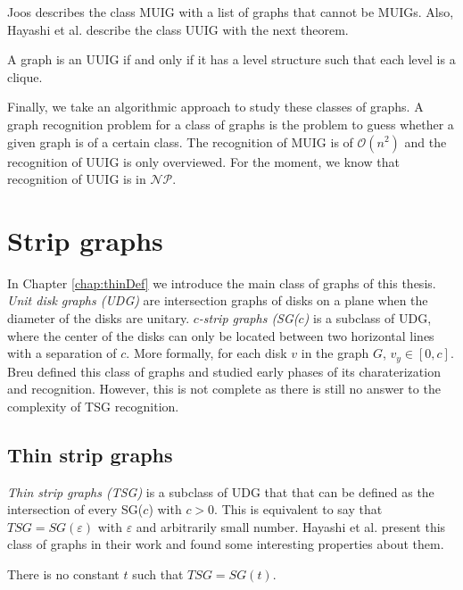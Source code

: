 Joos describes the class MUIG \cite{joosCharacterizationMixedUnit2013} with a list of graphs that cannot be MUIGs. Also, Hayashi et al. describe the class UUIG with the next theorem.

\begin{_theo}
  A graph is an UUIG if and only if it has a level structure such that each level is a clique.
\end{_theo}

Finally, we take an algorithmic approach to study these classes of graphs. A graph recognition problem for a class of graphs is the problem to guess whether a given graph is of a certain class. The recognition of MUIG is of $\mathcal{O}(n^2)$ \cite{talonCompletionMixedUnit2014} and the recognition of UUIG is only overviewed. For the moment, we know that recognition of UUIG is in $\mathcal{NP}$.

\section*{Strip graphs}

In Chapter \ref{chap:thinDef} we introduce the main class of graphs of this thesis. \emph{Unit disk graphs (UDG)} are intersection graphs of disks on a plane when the diameter of the disks are unitary. \emph{$c$-strip graphs (SG($c$)} \cite{breuAlgorithmicAspectsConstrained1996} is a subclass of UDG, where the center of the disks can only be located between two horizontal lines with a separation of $c$. More formally, for each disk $v$ in the graph $G$, $v_y \in [0,c]$. Breu \cite{breuAlgorithmicAspectsConstrained1996} defined this class of graphs and studied early phases of its charaterization and recognition. However, this is not complete as there is still no answer to the complexity of TSG recognition.


\subsection*{Thin strip graphs}

\emph{Thin strip graphs (TSG)} is a subclass of UDG that that can be defined as the intersection of every SG($c$) with $c > 0$. This is equivalent to say that $TSG = SG(\varepsilon)$ with $\varepsilon$ and arbitrarily small number. Hayashi et al. \cite{hayashiThinStripGraphs2017} present this class of graphs in their work and found some interesting properties about them.

\begin{_theo}
  There is no constant $t$ such that $TSG = SG(t)$.
\end{_theo}

